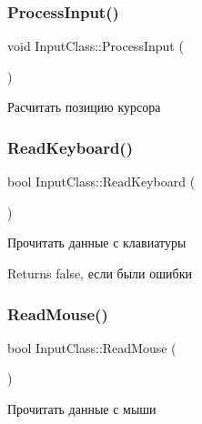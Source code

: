 \subsubsection{\texorpdfstring{Process\+Input()}{ProcessInput()}}
{\footnotesize\ttfamily void Input\+Class\+::\+Process\+Input (\begin{DoxyParamCaption}{ }\end{DoxyParamCaption})\hspace{0.3cm}{\ttfamily [private]}}



Расчитать позицию курсора 

\mbox{\label{class_input_class_ae7280f9f29e4638b3a031548913f05ea}} 
\subsubsection{\texorpdfstring{Read\+Keyboard()}{ReadKeyboard()}}
{\footnotesize\ttfamily bool Input\+Class\+::\+Read\+Keyboard (\begin{DoxyParamCaption}{ }\end{DoxyParamCaption})\hspace{0.3cm}{\ttfamily [private]}}



Прочитать данные с клавиатуры 

\begin{DoxyReturn}{Returns}
false, если были ошибки 
\end{DoxyReturn}
\mbox{\label{class_input_class_ab15b53b43aef926cb37dbbefee25dc5e}} 
\subsubsection{\texorpdfstring{Read\+Mouse()}{ReadMouse()}}
{\footnotesize\ttfamily bool Input\+Class\+::\+Read\+Mouse (\begin{DoxyParamCaption}{ }\end{DoxyParamCaption})\hspace{0.3cm}{\ttfamily [private]}}



Прочитать данные с мыши 

